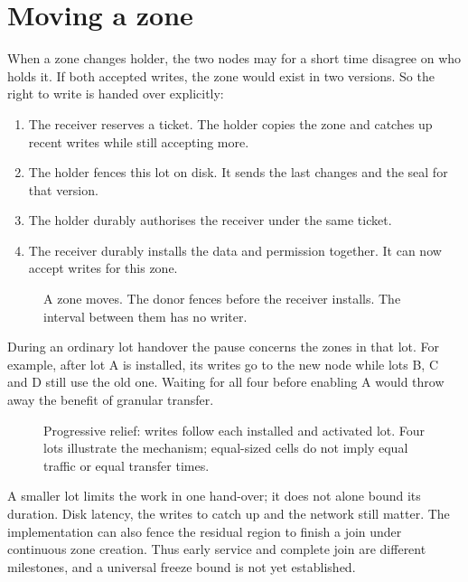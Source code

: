 \documentclass[11pt]{article}
\begin{document}
\section{Moving a zone}\hypertarget{ix:handoff}{}
When a zone changes holder, the two nodes may for a short time disagree on who holds it. If both accepted writes, the zone would exist in two versions. So the right to write is handed over explicitly:
\begin{enumerate}[leftmargin=1.5em,itemsep=1pt]
  \item The receiver reserves a ticket. The holder copies the zone and catches up recent writes while still accepting more.
  \item The holder fences this lot on disk. It sends the last changes and the seal for that version.
  \item The holder durably authorises the receiver under the same ticket.
  \item The receiver durably installs the data and permission together. It can now accept writes for this zone.
\end{enumerate}

\begin{figure}[H]
    \centering
    \caption{A zone moves. The donor fences before the receiver installs. The interval between them has no writer.}
\end{figure}

During an ordinary lot handover the pause concerns the zones in that lot. For example, after lot A is installed, its writes go to the new node while lots B, C and D still use the old one. Waiting for all four before enabling A would throw away the benefit of granular transfer.

\begin{figure}[H]
    \centering
    \caption{Progressive relief: writes follow each installed and activated lot. Four lots illustrate the mechanism; equal-sized cells do not imply equal traffic or equal transfer times.}
\end{figure}

A smaller lot limits the work in one hand-over; it does not alone bound its duration. Disk latency, the writes to catch up and the network still matter. The implementation can also fence the residual region to finish a join under continuous zone creation. Thus early service and complete join are different milestones, and a universal freeze bound is not yet established.
\end{document}
